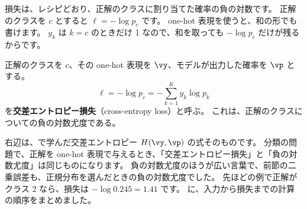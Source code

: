 損失は、レシピどおり、正解のクラスに割り当てた確率の負の対数です。
正解のクラスを $c$ とすると $\ell = -\log p_c$ です。
one-hot 表現を使うと、和の形でも書けます。
$y_k$ は $k=c$ のときだけ 1 なので、和を取っても $-\log p_c$ だけが残るからです。

\begin{definition}[交差エントロピー損失]\label{def:ml-cross-entropy}
正解のクラスを $c$、その one-hot 表現を $\vy$、モデルが出力した確率を $\vp$ とする。
\begin{equation}
\ell = -\log p_c = -\sum_{k=1}^{K} y_k \log p_k
\label{eq:ml-cross-entropy}
\end{equation}
を\textbf{交差エントロピー損失}（cross-entropy loss）と呼ぶ。
これは、正解のクラスについての負の対数尤度である。
\end{definition}

右辺は、で学んだ交差エントロピー $H(\vy,\vp)$ の式そのものです。
分類の問題で、正解を one-hot 表現で与えるとき、「交差エントロピー損失」と「負の対数尤度」は同じものになります。
負の対数尤度のほうが広い言葉で、前節の二乗誤差も、正規分布を選んだときの負の対数尤度でした。
先ほどの例で正解がクラス 2 なら、損失は $-\log 0.245 = 1.41$ です。
に、入力から損失までの計算の順序をまとめました。

